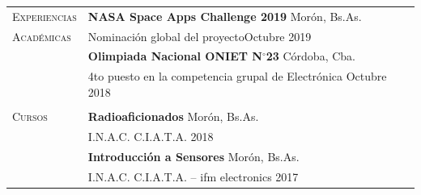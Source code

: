 \documentclass[12pt]{article}
\begin{document}
\begin{tabular}[t]{@{}p{1.15in} @{}p{5.35in}}
   {\scshape Experiencias}
   &
   \textbf{NASA Space Apps Challenge 2019}  \hfill Morón, Bs.As.\vspace{0.015in} \\ 
   {\scshape Académicas} %
   & Nominación global del proyecto\hfill Octubre 2019\vspace{0.015in}
   \vspace{0.7\baselineskip}
   \\
   & \textbf{Olimpiada Nacional ONIET N$^{\circ}$23}  \hfill Córdoba, Cba.\vspace{0.015in} \\ &
   4to puesto en la competencia grupal de Electrónica \hfill Octubre 2018\vspace{0.015in}
   \\ 
   &
   \vspace{.3\baselineskip}
   {\noindent\hspace{-50mm}\hrulefill}
   \vspace{.7\baselineskip}
   \\
   {\scshape Cursos}
   &
   \textbf{Radioaficionados}  \hfill Morón, Bs.As.\vspace{0.015in} \\ 
   & I.N.A.C. C.I.A.T.A. \hfill 2018\vspace{0.015in}
   \vspace{0.7\baselineskip}
   \\
   & \textbf{Introducción a Sensores}  \hfill Morón, Bs.As.\vspace{0.015in} \\ &
   I.N.A.C. C.I.A.T.A. -- ifm electronics \hfill 2017\vspace{0.015in}
   \\

   \end{tabular}
\end{document}

